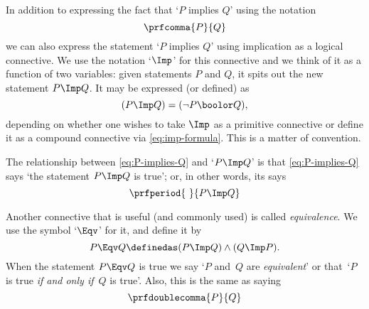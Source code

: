 In addition to expressing the fact that `$P$ implies $Q$' using the notation
\begin{equation}\label{eq:P-implies-Q}
    \prfcomma
    {P}{Q}
\end{equation}
we can also express the statement `$P$ implies $Q$' using implication as a logical connective.
We use the notation `$\Imp$' for this connective and we think of it as a function of two variables: given statements $P$ and $Q$, it spits out the new statement $P \Imp Q$.
It may be expressed (or defined) as
\begin{equation}\label{eq:imp-formula}
    (P \Imp Q) = (\lnot P \boolor Q),
\end{equation}
depending on whether one wishes to take $\Imp$ as a primitive connective or define it as a compound connective via \cref{eq:imp-formula}.
This is a matter of convention.

The relationship between \cref{eq:P-implies-Q} and `$P \Imp Q$' is that  \cref{eq:P-implies-Q} says `the statement $P \Imp Q$ is true'; or, in other words, its says
\begin{equation}
    \prfperiod
    {\ }{P \Imp Q}
\end{equation}

Another connective that is useful (and commonly used) is called \emph{equivalence}.
We use the symbol `$\Eqv$' for it, and define it by
\begin{equation}
    P \Eqv Q \definedas (P \Imp Q) \wedge (Q \Imp P).
\end{equation}
When the statement $P \Eqv Q$ is true we say `$P$ and~$Q$ are \emph{equivalent}' or that~`$P$ is true \emph{if and only if}~$Q$ is true'.
Also, this is the same as saying
\begin{equation*}
    \prfdoublecomma{
        P
    }{
        Q
    }
\end{equation*}
